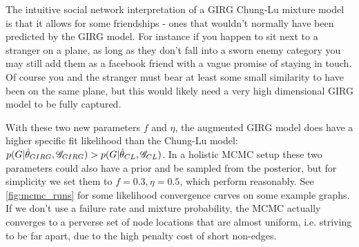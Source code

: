 The intuitive social network interpretation of a GIRG Chung-Lu mixture model is that it allows for some  friendships - ones that wouldn't normally have been predicted by the GIRG model. For instance if you happen to sit next to a stranger on a plane, as long as they don't fall into a sworn enemy category you may still add them as a facebook friend with a vague promise of staying in touch. Of course you and the stranger must bear at least some small similarity to have been on the same plane, but this would likely need a very high dimensional GIRG model to be fully captured. 


With these two new parameters $f$ and $\eta$, the augmented GIRG model does have a higher specific fit likelihood than the Chung-Lu model: $p(G | \hat{\theta}_{GIRG}, \mathscr{G}_{GIRG}) > p(G | \hat{\theta}_{CL}, \mathscr{G}_{CL})$. In a holistic MCMC setup these two parameters could also have a prior and be sampled from the posterior, but for simplicity we set them to $f=0.3, \eta=0.5$, which perform reasonably. See \cref{fig:mcmc_runs} for some likelihood convergence curves on some example graphs. If we don't use a failure rate and mixture probability, the MCMC actually converges to a perverse set of node locations that are almost uniform, i.e. striving to be far apart, due to the high penalty cost of short non-edges.




